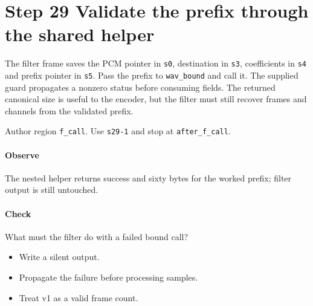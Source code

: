 \section{Step 29 Validate the prefix through the shared helper}\label{pcm-wav-s29}
The filter frame saves the PCM pointer in \texttt{s0}, destination in \texttt{s3}, coefficients in \texttt{s4} and prefix pointer in \texttt{s5}. Pass the prefix to \texttt{wav\_bound} and call it. The supplied guard propagates a nonzero status before consuming fields. The returned canonical size is useful to the encoder, but the filter must still recover frames and channels from the validated prefix.

Author region \texttt{f\_call}. Use \texttt{s29-1} and stop at \texttt{after\_f\_call}.

\paragraph{Observe} The nested helper returns success and sixty bytes for the worked prefix; filter output is still untouched.

\paragraph{Check} What must the filter do with a failed bound call?
\begin{itemize}
\item[A.] Write a silent output.
\item[B.] Propagate the failure before processing samples.
\item[C.] Treat v1 as a valid frame count.
\end{itemize}
